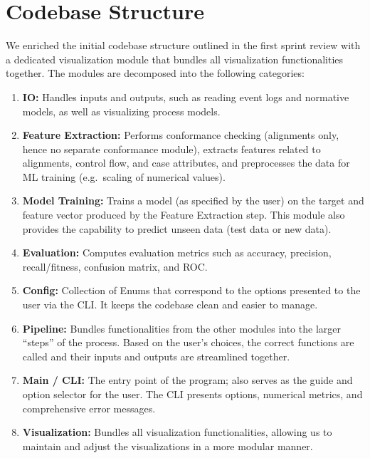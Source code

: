 \documentclass[12pt,a4paper]{article}
\begin{document}
\section{Codebase Structure}
We enriched the initial codebase structure outlined in the first sprint review with a dedicated visualization module that bundles all visualization functionalities together. The modules are decomposed into the following categories:
\begin{enumerate}
	\item \textbf{IO:} Handles inputs and outputs, such as reading event logs and normative models, as well as visualizing process models.
	\item \textbf{Feature Extraction:} Performs conformance checking (alignments only, hence no separate conformance module), extracts features related to alignments, control flow, and case attributes, and preprocesses the data for ML training (e.g.\ scaling of numerical values).
	\item \textbf{Model Training:} Trains a model (as specified by the user) on the target and feature vector produced by the Feature Extraction step. This module also provides the capability to predict unseen data (test data or new data).
	\item \textbf{Evaluation:} Computes evaluation metrics such as accuracy, precision, recall/fitness, confusion matrix, and ROC.
	\item \textbf{Config:} Collection of Enums that correspond to the options presented to the user via the CLI. It keeps the codebase clean and easier to manage.
	\item \textbf{Pipeline:} Bundles functionalities from the other modules into the larger ``steps'' of the process. Based on the user's choices, the correct functions are called and their inputs and outputs are streamlined together.
	\item \textbf{Main / CLI:} The entry point of the program; also serves as the guide and option selector for the user. The CLI presents options, numerical metrics, and comprehensive error messages.
	\item \textbf{Visualization:} Bundles all visualization functionalities, allowing us to maintain and adjust the visualizations in a more modular manner.
\end{enumerate}
\end{document}
